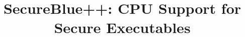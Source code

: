 \documentclass[ngerman]{sig-alternate-05-2015}
\begin{document}






%

\title{SecureBlue++: CPU Support for Secure Executables}
%
%
%
%
%
\end{document}
